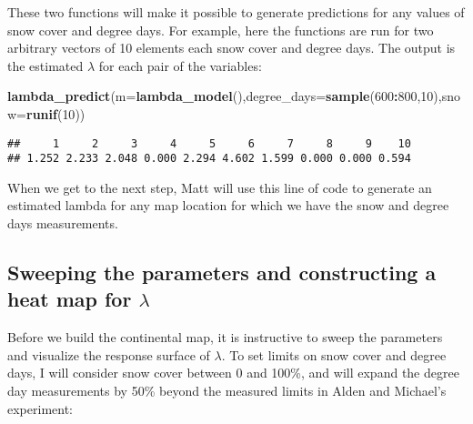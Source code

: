 \documentclass[]{article}
\newenvironment{Shaded}{\begin{snugshade}}{\end{snugshade}}
\newcommand{\DataTypeTok}[1]{\textcolor[rgb]{0.13,0.29,0.53}{#1}}
\newcommand{\DecValTok}[1]{\textcolor[rgb]{0.00,0.00,0.81}{#1}}
\newcommand{\KeywordTok}[1]{\textcolor[rgb]{0.13,0.29,0.53}{\textbf{#1}}}
\newcommand{\NormalTok}[1]{#1}
\newcommand{\OperatorTok}[1]{\textcolor[rgb]{0.81,0.36,0.00}{\textbf{#1}}}
\begin{document}
These two functions will make it possible to generate predictions for
any values of snow cover and degree days. For example, here the
functions are run for two arbitrary vectors of 10 elements each snow
cover and degree days. The output is the estimated \(\lambda\) for each
pair of the variables:

\begin{Shaded}
\begin{Highlighting}[]
\KeywordTok{lambda_predict}\NormalTok{(}\DataTypeTok{m=}\KeywordTok{lambda_model}\NormalTok{(),}\DataTypeTok{degree_days=}\KeywordTok{sample}\NormalTok{(}\DecValTok{600}\OperatorTok{:}\DecValTok{800}\NormalTok{,}\DecValTok{10}\NormalTok{),}\DataTypeTok{snow=}\KeywordTok{runif}\NormalTok{(}\DecValTok{10}\NormalTok{))}
\end{Highlighting}
\end{Shaded}

\begin{verbatim}
##     1     2     3     4     5     6     7     8     9    10 
## 1.252 2.233 2.048 0.000 2.294 4.602 1.599 0.000 0.000 0.594
\end{verbatim}

When we get to the next step, Matt will use this line of code to
generate an estimated lambda for any map location for which we have the
snow and degree days measurements.

\hypertarget{sweeping-the-parameters-and-constructing-a-heat-map-for-lambda}{%
\subsection{\texorpdfstring{Sweeping the parameters and constructing a
heat map for
\(\lambda\)}{Sweeping the parameters and constructing a heat map for \textbackslash{}lambda}}\label{sweeping-the-parameters-and-constructing-a-heat-map-for-lambda}}

Before we build the continental map, it is instructive to sweep the
parameters and visualize the response surface of \(\lambda\). To set
limits on snow cover and degree days, I will consider snow cover between
0 and 100\%, and will expand the degree day measurements by 50\% beyond
the measured limits in Alden and Michael's experiment:
\end{document}
